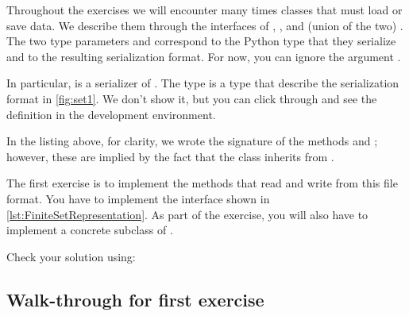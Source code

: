 Throughout the exercises we will encounter many times classes that must load or save data.
We describe them through the interfaces of , , and (union of the two) .
The two type parameters  and  correspond to the Python type that they serialize and to the resulting serialization format.
For now, you can ignore the argument .


In particular,  is a serializer of .
The type  is a type that describe the serialization format in \cref{fig:set1}.
We don't show it, but you can click through and see the definition in the development environment.


In the listing above, for clarity, we wrote the signature of the methods  and ;
however, these are implied by the fact that the class inherits from .

\begin{codeexercise}
    \label{ex:setrepr}
    The first exercise is to implement the methods that read and write from this file format.
    You have to implement the interface \FiniteSetRepresentation shown in \cref{lst:FiniteSetRepresentation}.
    As part of the exercise, you will also have to implement a concrete subclass of \FiniteSet.

    Check your solution using:


\end{codeexercise}



\subsection{Walk-through for first exercise}

